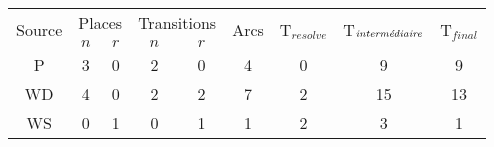\begin{tabular}[h]{c|c|c|c|c|c|c|c|c}
  \multirow{2}{*}{Source} & \multicolumn{2}{c|}{Places} &
  \multicolumn{2}{c|}{Transitions} & \multirow{2}{*}{Arcs} &
  \multirow{2}{*}{T$_{resolve}$} &
  \multirow{2}{*}{T$_{\text{\textit{intermédiaire}}}$} &
  \multirow{2}{*}{T$_{final}$} \\
  & $n$ & $r$ & $n$ & $r$ & & & & \\
  \hline
  P  & 3 & 0 & 2 & 0 & 4 & 0 & 9 & 9 \\
  WD & 4 & 0 & 2 & 2 & 7 & 2 & 15 & 13 \\
  WS & 0 & 1 & 0 & 1 & 1 & 2 & 3 & 1 \\
\end{tabular}
